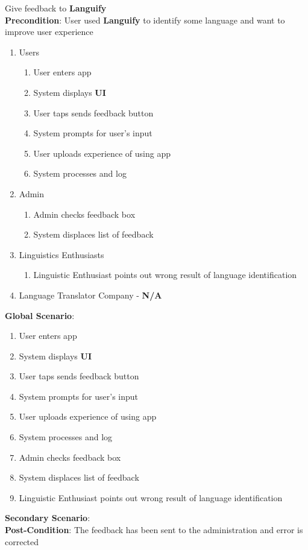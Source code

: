 \item Give feedback to \textbf{Languify}
	\\ \textbf{Precondition}: User used \textbf{Languify} to identify some language and want to improve user experience
	\begin{enumerate}[{\bf VP1.}]
		\item Users
			\begin{enumerate}[{\bf 1.}]
				\item User enters app
				\item System displays \textbf{UI}
				\item User taps sends feedback button
				\item System prompts for user’s input
				\item User uploads experience of using app
				\item System processes and log
			\end{enumerate}
		\item Admin
			\begin{enumerate}[{\bf 1.}]
				\item Admin checks feedback box
				\item System displaces list of feedback
			\end{enumerate}
		\item Linguistics Enthusiasts
		\begin{enumerate}[{\bf 1.}]
			\item Linguistic Enthusiast points out wrong result of language identification
		\end{enumerate}
		\item Language Translator Company - \textbf{N/A}
	\end{enumerate}
	\textbf{Global Scenario}:
	\begin{enumerate}[{\bf 1.}]
		\item User enters app
		\item System displays \textbf{UI}
		\item User taps sends feedback button
		\item System prompts for user’s input
		\item User uploads experience of using app
		\item System processes and log
		\item Admin checks feedback box
		\item System displaces list of feedback
		\item Linguistic Enthusiast points out wrong result of language identification
	\end{enumerate}
	\textbf{Secondary Scenario}:
	\\ \textbf{Post-Condition}: The feedback has been sent to the administration and error is corrected